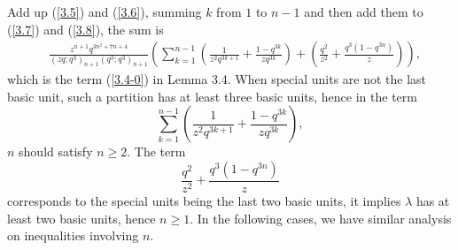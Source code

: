 \documentclass[draft]{amsart}
\numberwithin{equation}{section}
\theoremstyle{plain}
\theoremstyle{remark}
\begin{document}
Add up (\ref{3.5}) and (\ref{3.6}), summing $k$ from $1$ to $n-1$ and then add them to (\ref{3.7}) and (\ref{3.8}), the sum is
\begin{align}\nonumber
&\frac{z^{n+1}q^{3n^{2}+7n+4}}{(zq;q^{3})_{n+1}(q^{3};q^{3})_{n+1}}\left( \sum_{k=1} ^{n-1}\left(\frac{1}{z^{2}q^{3k+1}}+\frac{1-q^{3k}}{zq^{3k}}\right)+\left(\frac{q^{2}}{z^{2}}+\frac{q^{3}(1-q^{3n})}{z}\right)  \right)\nonumber,
\end{align}
which is the term (\ref{3.4-0}) in Lemma 3.4. When special units are not the last basic unit, such a partition has at least three basic units, hence in the term
$$
\sum_{k=1} ^{n-1}\left(\frac{1}{z^{2}q^{3k+1}}+\frac{1-q^{3k}}{zq^{3k}}\right),
$$
$n$ should satisfy $n\geq 2$. The term $$\frac{q^{2}}{z^{2}}+\frac{q^{3}(1-q^{3n})}{z}$$ corresponds to the special units being
the last two basic units, it implies $\lambda$ has at least two basic units, hence $n\geq 1$. In the following cases, we have similar analysis on inequalities involving $n$. 
\end{document}
